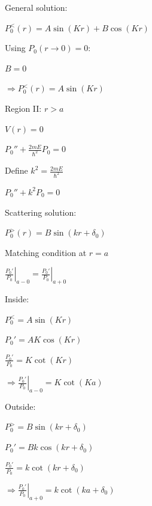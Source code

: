 \documentclass[11pt,a4paper]{scrartcl}
\begin{document}
\begin{enumerate}
\begin{calculationbox}
\begin{calculationbox}
                    General solution:

                    $P_0^{<}(r) = A \sin(Kr) + B \cos(Kr)$

                    Using $P_0(r \to 0)=0$:

                    $B = 0$

                    $\Rightarrow P_0^{<}(r) = A \sin(Kr)$
                \end{calculationbox}

                Region II: $r > a$
                \begin{calculationbox}
                    $V(r) = 0$

                    $P_0'' + \frac{2mE}{\hbar^2} P_0 = 0$

                    Define $k^2 = \frac{2mE}{\hbar^2}$

                    $P_0'' + k^2 P_0 = 0$

                    Scattering solution:

                    $P_0^{>}(r) = B \sin(kr + \delta_0)$
                \end{calculationbox}

                Matching condition at $r = a$
                \begin{calculationbox}
                    $\left.\frac{P_0'}{P_0}\right|_{a-0}
                    =
                    \left.\frac{P_0'}{P_0}\right|_{a+0}$
                \end{calculationbox}

                Inside:
                \begin{calculationbox}
                    $P_0^{<} = A \sin(Kr)$

                    $P_0' = AK \cos(Kr)$

                    $\frac{P_0'}{P_0} = K \cot(Kr)$

                    $\Rightarrow \left.\frac{P_0'}{P_0}\right|_{a-0} = K \cot(Ka)$
                \end{calculationbox}

                Outside:
                \begin{calculationbox}
                    $P_0^{>} = B \sin(kr + \delta_0)$

                    $P_0' = Bk \cos(kr + \delta_0)$

                    $\frac{P_0'}{P_0} = k \cot(kr + \delta_0)$

                    $\Rightarrow \left.\frac{P_0'}{P_0}\right|_{a+0} = k \cot(ka + \delta_0)$
                \end{calculationbox}


\end{calculationbox}
\end{enumerate}
\end{document}
